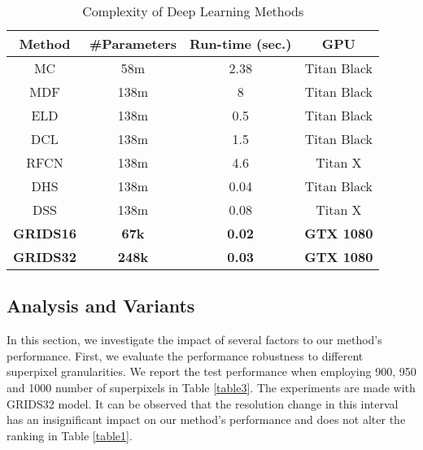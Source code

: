 \documentclass[a4paper,conference]{IEEEtran}
\begin{document}
\begin{table}[!t]
\renewcommand{\arraystretch}{1.3}

\caption{Complexity of Deep Learning Methods}
\label{table2}
\centering
\begin{tabular}{|c||c||c||c|}
\hline
Method & \#Parameters & Run-time (sec.) & GPU\\
\hline
MC & 58m & 2.38 & Titan Black\\\hline
MDF & 138m & 8 & Titan Black\\\hline
ELD & 138m & 0.5 & Titan Black\\\hline
DCL & 138m & 1.5 & Titan Black\\\hline
RFCN & 138m & 4.6 & Titan X\\\hline
DHS & 138m & 0.04 & Titan Black\\\hline
DSS & 138m & 0.08 & Titan X\\\hline
\textbf{GRIDS16} & \textbf{67k} & \textbf{0.02} & \textbf{GTX 1080}\\\hline
\textbf{GRIDS32} & \textbf{248k} & \textbf{0.03} & \textbf{GTX 1080}\\\hline

\end{tabular}
\end{table}

\subsection{Analysis and Variants}
In this section, we investigate the impact of several factors to our method's performance.
First, we evaluate the performance robustness to different superpixel granularities. 
We report the test performance when employing 900, 950 and 1000 number of superpixels in Table \ref{table3}.
The experiments are made with GRIDS32 model.
It can be observed that the resolution change in this interval has an insignificant impact on our method's performance and does not alter the ranking in Table \ref{table1}.
\end{document}
